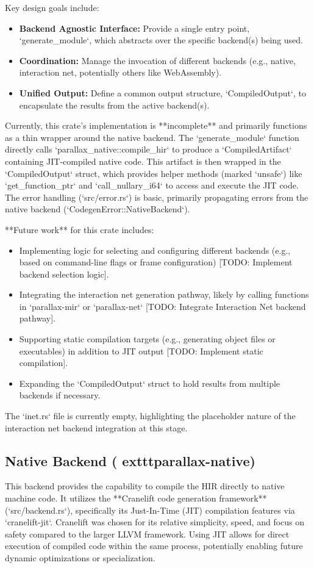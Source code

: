 Key design goals include:
\begin{itemize}
    \item \textbf{Backend Agnostic Interface:} Provide a single entry point, `generate_module`, which abstracts over the specific backend(s) being used.
    \item \textbf{Coordination:} Manage the invocation of different backends (e.g., native, interaction net, potentially others like WebAssembly).
    \item \textbf{Unified Output:} Define a common output structure, `CompiledOutput`, to encapsulate the results from the active backend(s).
\end{itemize}

Currently, this crate's implementation is **incomplete** and primarily functions as a thin wrapper around the native backend. The `generate_module` function directly calls `parallax_native::compile_hir` to produce a `CompiledArtifact` containing JIT-compiled native code. This artifact is then wrapped in the `CompiledOutput` struct, which provides helper methods (marked `unsafe`) like `get_function_ptr` and `call_nullary_i64` to access and execute the JIT code. The error handling (`src/error.rs`) is basic, primarily propagating errors from the native backend (`CodegenError::NativeBackend`).

**Future work** for this crate includes:
\begin{itemize}
    \item Implementing logic for selecting and configuring different backends (e.g., based on command-line flags or frame configuration) [TODO: Implement backend selection logic].
    \item Integrating the interaction net generation pathway, likely by calling functions in `parallax-mir` or `parallax-net` [TODO: Integrate Interaction Net backend pathway].
    \item Supporting static compilation targets (e.g., generating object files or executables) in addition to JIT output [TODO: Implement static compilation].
    \item Expanding the `CompiledOutput` struct to hold results from multiple backends if necessary.
\end{itemize}

The `inet.rs` file is currently empty, highlighting the placeholder nature of the interaction net backend integration at this stage.

\subsection{Native Backend (	exttt{parallax-native})} %
This backend provides the capability to compile the HIR directly to native machine code. It utilizes the **Cranelift code generation framework** (`src/backend.rs`), specifically its Just-In-Time (JIT) compilation features via `cranelift-jit`. Cranelift was chosen for its relative simplicity, speed, and focus on safety compared to the larger LLVM framework. Using JIT allows for direct execution of compiled code within the same process, potentially enabling future dynamic optimizations or specialization.

